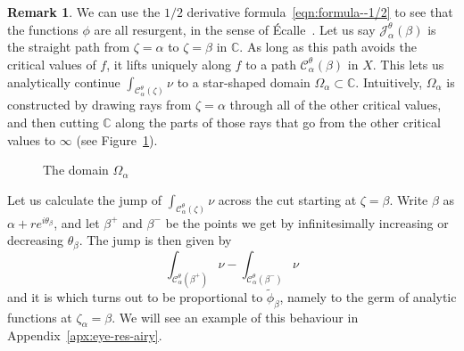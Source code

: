 \documentclass{article}
\newcommand{\C}{\mathbb{C}}
\theoremstyle{definition}
\newtheorem{remark}[definition]{Remark}
\theoremstyle{plain}
\begin{document}
\begin{remark}
We can use the $1/2$ derivative formula~\eqref{eqn:formula--1/2} to see that the functions $\phi$ are all resurgent, in the sense of \'{E}calle~\cite[Section~1]{EcalleI}. Let us say $\mathcal{J}_\alpha^\theta(\beta)$ is the straight path from $\zeta = \alpha$ to $\zeta = \beta$ in $\C$. As long as this path avoids the critical values of $f$, it lifts uniquely along $f$ to a path $\mathcal{C}_\alpha^\theta(\beta)$ in $X$. This lets us analytically continue $\int_{\mathcal{C}_\alpha^\theta(\zeta)} \nu$ to a star-shaped domain $\Omega_\alpha \subset \C$. Intuitively, $\Omega_\alpha$ is constructed by drawing rays from $\zeta = \alpha$ through all of the other critical values, and then cutting $\C$ along the parts of those rays that go from the other critical values to $\infty$ (see Figure~\ref{Fig:slit domain}).
\begin{figure}
\center
\begin{center}
\end{center}
\caption{The domain $\Omega_\alpha$}\label{Fig:slit domain}
\end{figure}
Let us calculate the jump of $\int_{\mathcal{C}_\alpha^\theta(\zeta)}\nu$ across the cut starting at $\zeta = \beta$. Write $\beta$ as $\alpha + re^{i\theta_\beta}$, and let $\beta^+$ and $\beta^-$ be the points we get by infinitesimally increasing or decreasing $\theta_\beta$. The jump is then given by \[\int_{\mathcal{C}_\alpha^\theta(\beta^+)} \nu - \int_{\mathcal{C}_\alpha^\theta(\beta^-)} \nu\] 
and it is 
which turns out to be proportional to $\tilde{\phi}_\beta$, namely to the germ of analytic functions at $\zeta_\alpha=\beta$. We will see an example of this behaviour in Appendix~\ref{apx:eye-res-airy}. 



\end{remark}
\end{document}
